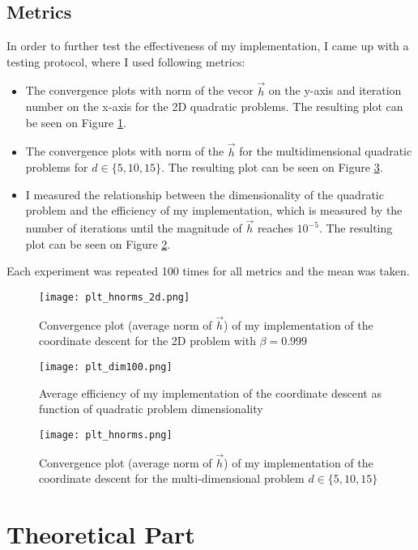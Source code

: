 \documentclass[a4paper]{article}
\begin{document}
\subsection{Metrics}
In order to further test the effectiveness of my implementation, I came up with a
testing protocol, where I used following metrics:
\begin{itemize}
\item The convergence plots with norm of the vecor $\vec{h}$ on the y-axis and
  iteration number on the x-axis for the 2D quadratic problems.
  The resulting plot can be seen on Figure \ref{plt2}.
\item The convergence plots with norm of the $\vec{h}$ for the multidimensional
  quadratic problems for $d \in \{5, 10, 15\}$. The resulting plot can be seen
  on Figure \ref{plt3}.
\item I measured the relationship between the dimensionality of the quadratic
  problem and the efficiency of my implementation, which is measured by the
  number of iterations until the magnitude of $\vec{h}$ reaches $10^{-5}$. The
  resulting plot can be seen on Figure \ref{plt1}.
\end{itemize}
Each experiment was repeated 100 times for all metrics and the mean was taken.

\begin{figure}[]
    \centering
    \texttt{[image: plt\_hnorms\_2d.png]}
    \caption{Convergence plot (average norm of $\vec{h}$) of my implementation of the coordinate descent
      for the 2D problem with $\beta = 0.999$}
  \label{plt2}
\end{figure}
\begin{figure}[]
    \centering
    \texttt{[image: plt\_dim100.png]}
    \caption{Average efficiency of my implementation of the coordinate descent
      as function of quadratic problem dimensionality}
  \label{plt1}
\end{figure}


\begin{figure}[]
    \centering
    \texttt{[image: plt\_hnorms.png]}
    \caption{Convergence plot (average norm of $\vec{h}$) of my implementation of the
      coordinate descent for the multi-dimensional problem $d \in \{ 5,10,15\}$}
  \label{plt3}
\end{figure}

\section{Theoretical Part}
\end{document}
